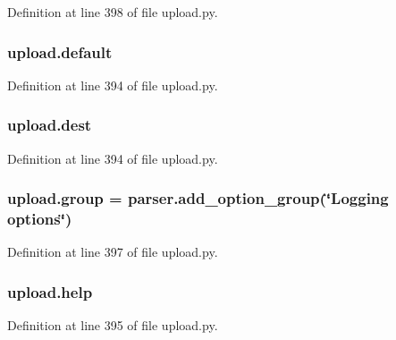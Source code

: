Definition at line 398 of file upload.\+py.

\subsubsection[{\texorpdfstring{default}{default}}]{\setlength{\rightskip}{0pt plus 5cm}upload.\+default}\hypertarget{namespaceupload_af4be925d9a50d5ad134d86400509d0f2}{}\label{namespaceupload_af4be925d9a50d5ad134d86400509d0f2}


Definition at line 394 of file upload.\+py.

\subsubsection[{\texorpdfstring{dest}{dest}}]{\setlength{\rightskip}{0pt plus 5cm}upload.\+dest}\hypertarget{namespaceupload_a770d9c7b49b1fede80de6078d5e49af7}{}\label{namespaceupload_a770d9c7b49b1fede80de6078d5e49af7}


Definition at line 394 of file upload.\+py.

\subsubsection[{\texorpdfstring{group}{group}}]{\setlength{\rightskip}{0pt plus 5cm}upload.\+group = parser.\+add\+\_\+option\+\_\+group(\char`\"{}Logging options\char`\"{})}\hypertarget{namespaceupload_a9d33d66de17175dced88ffe95f079226}{}\label{namespaceupload_a9d33d66de17175dced88ffe95f079226}


Definition at line 397 of file upload.\+py.

\subsubsection[{\texorpdfstring{help}{help}}]{\setlength{\rightskip}{0pt plus 5cm}upload.\+help}\hypertarget{namespaceupload_abfc23c9aa2d9b777678da117a85929a5}{}\label{namespaceupload_abfc23c9aa2d9b777678da117a85929a5}


Definition at line 395 of file upload.\+py.


